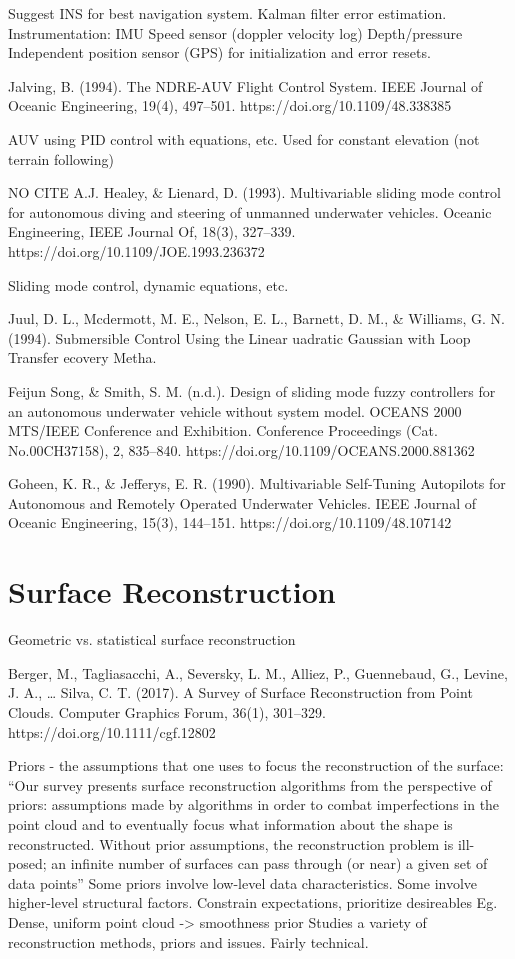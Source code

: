 Suggest INS for best navigation system.
Kalman filter error estimation.
Instrumentation:
IMU
Speed sensor (doppler velocity log)
Depth/pressure
Independent position sensor (GPS) for initialization and error resets.

\cite{Jalving1994}
Jalving, B. (1994). The NDRE-AUV Flight Control System. IEEE Journal of Oceanic Engineering, 19(4), 497–501. https://doi.org/10.1109/48.338385

AUV using PID control with equations, etc.
Used for constant elevation (not terrain following)

NO CITE
A.J. Healey, \& Lienard, D. (1993). Multivariable sliding mode control for autonomous diving and steering of unmanned underwater vehicles. Oceanic Engineering, IEEE Journal Of, 18(3), 327–339. https://doi.org/10.1109/JOE.1993.236372

Sliding mode control, dynamic equations, etc.

\cite{Juul1994}
Juul, D. L., Mcdermott, M. E., Nelson, E. L., Barnett, D. M., \& Williams, G. N. (1994). Submersible Control Using the Linear uadratic Gaussian with Loop Transfer ecovery Metha.

\cite{FeijunSong}
Feijun Song, \& Smith, S. M. (n.d.). Design of sliding mode fuzzy controllers for an autonomous underwater vehicle without system model. OCEANS 2000 MTS/IEEE Conference and Exhibition. Conference Proceedings (Cat. No.00CH37158), 2, 835–840. https://doi.org/10.1109/OCEANS.2000.881362

\cite{Goheen1990}
Goheen, K. R., \& Jefferys, E. R. (1990). Multivariable Self-Tuning Autopilots for Autonomous and Remotely Operated Underwater Vehicles. IEEE Journal of Oceanic Engineering, 15(3), 144–151. https://doi.org/10.1109/48.107142

\section{Surface Reconstruction}

Geometric vs. statistical surface reconstruction

Berger, M., Tagliasacchi, A., Seversky, L. M., Alliez, P., Guennebaud, G., Levine, J. A., … Silva, C. T. (2017). A Survey of Surface Reconstruction from Point Clouds. Computer Graphics Forum, 36(1), 301–329. https://doi.org/10.1111/cgf.12802

Priors - the assumptions that one uses to focus the reconstruction of the surface:
“Our survey presents surface reconstruction algorithms from the perspective of priors: assumptions made by algorithms in order to combat imperfections in the point cloud and to eventually focus what information about the shape is reconstructed. Without prior assumptions, the reconstruction problem is ill-posed; an infinite number of surfaces can pass through (or near) a given set of data points”
Some priors involve low-level data characteristics. Some involve higher-level structural factors.
Constrain expectations, prioritize desireables
Eg. Dense, uniform point cloud -> smoothness prior
Studies a variety of reconstruction methods, priors and issues. 
Fairly technical.


